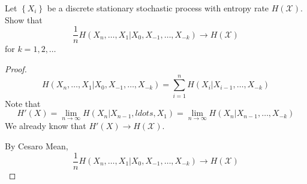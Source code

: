 \begin{exercise}{ Let $\left\{X_{i}\right\}$ be a discrete stationary stochastic process with entropy rate $H(\mathcal{X}) .$ Show that
  $$
  \frac{1}{n} H\left(X_{n}, \ldots, X_{1} | X_{0}, X_{-1}, \ldots, X_{-k}\right) \rightarrow H(\mathcal{X})
  $$
  for $k=1,2, \ldots$}
  \begin{proof}
  \begin{equation}
      H\left(X_{n}, \ldots, X_{1} | X_{0}, X_{-1}, \ldots, X_{-k}\right) = \sum_{i=1}^{n} H(X_i|X_{i-1},\ldots,X_{-k})
  \end{equation}
  Note that $$H'(X) = \lim_{n\rightarrow \infty}H(X_n|X_{n-1},ldots,X_1) = \lim_{n\rightarrow \infty}H(X_n|X_{n-1},\ldots,X_{-k})$$
  We already know that $H'(X)\rightarrow H(\mathcal{X})$.

  By Cesaro Mean, $$
  \frac{1}{n} H\left(X_{n}, \ldots, X_{1} | X_{0}, X_{-1}, \ldots, X_{-k}\right) \rightarrow H(\mathcal{X})
  $$
  \end{proof}
  \label{ex4-4}
\end{exercise}


